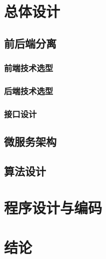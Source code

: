 \documentclass{ctexart}
\begin{document}
\section{总体设计}
\subsection{前后端分离}
\subsubsection{前端技术选型}
\subsubsection{后端技术选型}
\subsubsection{接口设计}
\subsection{微服务架构}
\subsection{算法设计}

\section{程序设计与编码}

\section{结论}
\end{document}
